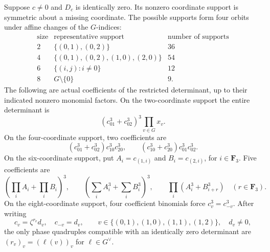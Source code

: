 \begin{lemma}
\label{lem:DE-Moore-support}
Suppose \(c\ne0\) and \(D_c\) is identically zero.  Its nonzero
coordinate support is symmetric about a missing coordinate.  The
possible supports form four orbits under affine changes of the
\(G\)-indices:
\[
\begin{array}{c|c|c}
\text{size}&\text{representative support}&\text{number of supports}\\\hline
2&\{(0,1),(0,2)\}&36\\
4&\{(0,1),(0,2),(1,0),(2,0)\}&54\\
6&\{(i,j):i\ne0\}&12\\
8&G\setminus\{0\}&9.
\end{array}                                                     \tag{DE-MC3}
\]
The following are actual coefficients of the restricted determinant,
up to their indicated nonzero monomial factors.
On the two-coordinate support the entire determinant is
\[
 (c_{01}^3+c_{02}^3)^3\prod_{v\in G}x_v.                         \tag{DE-MC4}
\]
On the four-coordinate support, two coefficients are
\[
 (c_{01}^3+c_{02}^3)c_{10}^3c_{20}^3,
 \qquad (c_{10}^3+c_{20}^3)c_{01}^3c_{02}^3.                     \tag{DE-MC5}
\]
On the six-coordinate support, put \(A_i=c_{(1,i)}\) and
\(B_i=c_{(2,i)}\), for \(i\in\mathbf F_3\).  Five coefficients are
\[
 \left(\prod_i A_i+\prod_i B_i\right)^3,
 \qquad\left(\sum_i A_i^3+\sum_i B_i^3\right)^3,
 \qquad\prod_i(A_i^3+B_{i+r}^3)\quad(r\in\mathbf F_3).
                                                               \tag{DE-MC6}
\]
On the eight-coordinate support, four coefficient binomials force
\(c_v^3=c_{-v}^3\).  After writing
\[
 c_v=\zeta^{r_v}d_v,\quad c_{-v}=d_v,
 \qquad v\in\{(0,1),(1,0),(1,1),(1,2)\},\quad d_v\ne0,
                                                               \tag{DE-MC7}
\]
the only phase quadruples compatible with an identically zero
determinant are \((r_v)_v=(\ell(v))_v\) for \(\ell\in G^\vee\).
\end{lemma}
